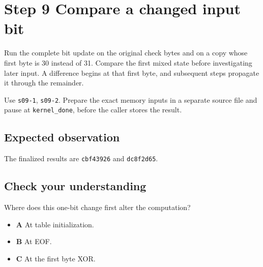 \section{Step 9 Compare a changed input bit}\label{crc-s09}

Run the complete bit update on the original check bytes and on a copy whose first byte is 30 instead of 31. Compare the first mixed state before investigating later input. A difference begins at that first byte, and subsequent steps propagate it through the remainder.

Use \texttt{s09-1}, \texttt{s09-2}. Prepare the exact memory inputs in a separate source file and pause at \texttt{kernel\_done}, before the caller stores the result.

\subsection{Expected observation}
The finalized results are \texttt{cbf43926} and \texttt{dc8f2d65}.

\subsection{Check your understanding}
Where does this one-bit change first alter the computation?

\begin{itemize}
  \item \textbf{A} At table initialization.
  \item \textbf{B} At EOF.
  \item \textbf{C} At the first byte XOR.
\end{itemize}
